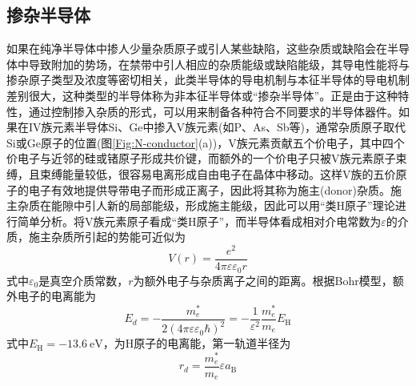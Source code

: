 \subsection{掺杂半导体} 
如果在纯净半导体中掺人少量杂质原子或引人某些缺陷，这些杂质或缺陷会在半导体中导致附加的势场，在禁带中引人相应的杂质能级或缺陷能级，其导电性能将与掺杂原子类型及浓度等密切相关，此类半导体的导电机制与本征半导体的导电机制差别很大，这种类型的半导体称为非本征半导体或``掺杂半导体''。正是由于这种特性，通过控制掺入杂质的形式，可以用来制备各种符合不同要求的半导体器件。如果在IV族元素半导体Si、Ge中掺入V族元素(如P、As、Sb等)，通常杂质原子取代Si或Ge原子的位置(图\ref{Fig:N-conductor}(a))，V族元素贡献五个价电子，其中四个价电子与近邻的硅或锗原子形成共价键，而额外的一个价电子只被V族元素原子束缚，且束缚能量较低，很容易电离形成自由电子在晶体中移动。这样V族的五价原子的电子有效地提供导带电子而形成正离子，因此将其称为施主(donor)杂质。施主杂质在能隙中引人新的局部能级，形成施主能级，因此可以用``类H原子''理论进行简单分析。将V族元素原子看成``类H原子''，而半导体看成相对介电常数为$\varepsilon$的介质，施主杂质所引起的势能可近似为
\begin{equation}
	V(r)=\dfrac{e^2}{4\pi\varepsilon\varepsilon_0r}
	\label{eq:donor-V}
\end{equation}
式中$\varepsilon_0$是真空介质常数，$r$为额外电子与杂质离子之间的距离。根据Bohr模型，额外电子的电离能为
\begin{equation}
	E_d=-\dfrac{m_e^{\ast}}{2(4\pi\varepsilon\varepsilon_0\hbar)^2}=-\dfrac1{\varepsilon^2}\dfrac{m_e^{\ast}}{m_e}E_{\mathrm{H}}
	\label{eq:donor-deion}
\end{equation}
式中$E_{\mathrm{H}}=-13.6~\mathrm{eV}$，为H原子的电离能，第一轨道半径为
\begin{equation}
	r_d=\dfrac{m_e^{\ast}}{m_e}\varepsilon a_{\mathrm{B}}
	\label{eq:donor-1-radius}
\end{equation}
